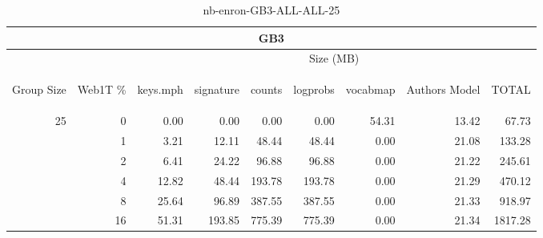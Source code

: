 \begin{center}
\begin{table}[htbp] 
 \begin{center}
\begin{tabular}{ | r | r | r | r | r | r | r | r | r |}
\hline
\multicolumn{9}{|c|}{GB3}\\
\hline
 & & \multicolumn{7}{|c|}{Size (MB)}\\ \cline{3-9}
\begin{sideways}Group Size\end{sideways} & \begin{sideways}Web1T \% \end{sideways} & \begin{sideways}keys.mph\end{sideways} & \begin{sideways}signature\end{sideways} & \begin{sideways}counts\end{sideways} & \begin{sideways}logprobs\end{sideways} & \begin{sideways}vocabmap\end{sideways} & \begin{sideways}Authors Model \end{sideways} & \begin{sideways}TOTAL\end{sideways}\\
\hline
\multirow{5}{*}{25}
 & 0 & 0.00 & 0.00 & 0.00 & 0.00 & 54.31 & 13.42 & 67.73\\ \cline{2-9}
 & 1 & 3.21 & 12.11 & 48.44 & 48.44 & 0.00 & 21.08 & 133.28\\ \cline{2-9}
 & 2 & 6.41 & 24.22 & 96.88 & 96.88 & 0.00 & 21.22 & 245.61\\ \cline{2-9}
 & 4 & 12.82 & 48.44 & 193.78 & 193.78 & 0.00 & 21.29 & 470.12\\ \cline{2-9}
 & 8 & 25.64 & 96.89 & 387.55 & 387.55 & 0.00 & 21.33 & 918.97\\ \cline{2-9}
 & 16 & 51.31 & 193.85 & 775.39 & 775.39 & 0.00 & 21.34 & 1817.28\\ \cline{2-9}
\hline
\end{tabular}
\caption{nb-enron-GB3-ALL-ALL-25}
\label{table:nb-enron-GB3-ALL-ALL-25}
\end{center}
 \end{table}
\end{center}

